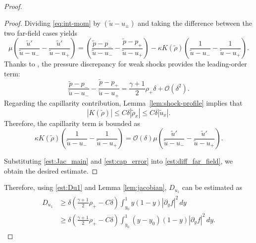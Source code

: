 \documentclass[11pt,reqno]{amsart}
\numberwithin{equation}{section} %
\begin{document}
\begin{proof}
\begin{proof}
    Dividing \eqref{eq:int-mom} by $(\tilde{u} - u_\pm)$ and taking the difference between the two far-field cases yields
    \begin{equation}\label{est:diff_far_field}
        \mu \left( \frac{\tilde{u}'}{\tilde{u} - u_-} - \frac{\tilde{u}'}{\tilde{u} - u_+} \right) = \left( \frac{\tilde{p} - p_-}{\tilde{u} - u_-} - \frac{\tilde{p} - p_+}{\tilde{u} - u_+} \right) - \kappa K(\tilde{\rho}) \left( \frac{1}{\tilde{u} - u_-} - \frac{1}{\tilde{u} - u_+} \right).
    \end{equation}
    Thanks to \cite[Lemma 4.6]{KOW25}, the pressure discrepancy for weak shocks provides the leading-order term:
    \begin{equation}\label{est:Jac_main}
        \frac{\tilde{p} - p_-}{\tilde{u} - u_-} - \frac{\tilde{p} - p_+}{\tilde{u} - u_+} = \frac{\gamma + 1}{2}\rho_+ \delta + \mathcal{O}(\delta^2).
    \end{equation}
    Regarding the capillarity contribution, Lemma~\ref{lem:shock-profile} implies that%
    \[|K(\tilde{\rho})| \le C \delta |\tilde{\rho}_x|\leq C \delta |\tilde{u}_x|.\] 
    Therefore, the capillarity term is bounded as
    \begin{equation}\label{est:cap_error}
        \kappa K(\tilde{\rho}) \left( \frac{1}{\tilde{u} - u_-} - \frac{1}{\tilde{u} - u_+} \right) = \mathcal{O}(\delta)\mu \left( \frac{\tilde{u}'}{\tilde{u} - u_-} - \frac{\tilde{u}'}{\tilde{u} - u_+} \right).
    \end{equation}
    
    
    Substituting \eqref{est:Jac_main} and \eqref{est:cap_error} into \eqref{est:diff_far_field}, we obtain the desired estimate.
\end{proof}

Therefore, using \eqref{est:Du1} and Lemma \ref{lem:jacobian}, $D_{u_1}$ can be estimated as
\begin{align}
\begin{aligned}\label{est:Du1_2}
	D_{u_1} &\ge \delta\left(\frac{\gamma+1}{2}\rho_+ - C\delta\right) \int_{y_0}^1 y(1-y) |\partial_y f|^2 \,dy\\
	&\ge\delta\left(\frac{\gamma+1}{2}\rho_+ - C\delta\right) \int_{y_0}^1 (y-y_0)(1-y) |\partial_y f|^2 \,dy.
\end{aligned}
\end{align}


\end{proof}
\end{document}
